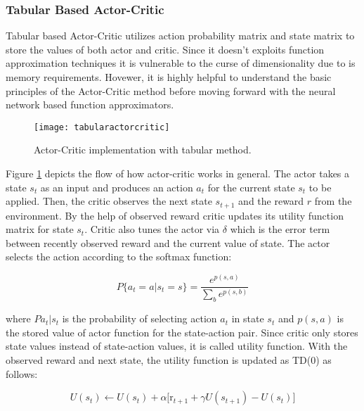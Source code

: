 \documentclass{ituphdreport}
\begin{document}
\subsubsection{Tabular Based Actor-Critic} \label{sec:actorcritictabular}
Tabular based Actor-Critic utilizes action probability matrix and state matrix to store the values of both actor and critic. Since it doesn't exploits function approximation techniques it is vulnerable to the curse of dimensionality due to is memory requirements. Hovewer, it is highly helpful to understand the basic principles of the Actor-Critic method before moving forward with the neural network based function approximators. 

\begin{figure}[h]
	\begin{center}
		\texttt{[image: tabularactorcritic]}
	\end{center}
	\caption{Actor-Critic implementation with tabular method.
		\label{fig:actorcritic}}
\end{figure}

Figure \ref{fig:actorcritic} depicts the flow of how actor-critic works in general. The actor takes a state $s_t$ as an input and produces an action $a_t$ for the current state $s_t$ to be applied. Then, the critic observes the next state  $s_{t+1}$ and the reward $r$ from the environment. By the help of observed reward critic updates its utility function matrix for state  $s_t$. Critic also tunes the actor via $\delta$ which is the error term between recently observed reward and the current value of state. The actor selects the action according to the softmax function:

\begin{equation}
\label{eq:acsoftmax}
P \{a_t = a | s_t = s\} = \frac{e^{p(s,a)}}{\sum_{b}^{} e^{p(s,b)} }
\end{equation}

where $P{a_t|s_t}$ is the probability of selecting action $a_t$ in state $s_t$ and $p(s,a)$ is the stored value of actor function for the state-action pair. Since critic only stores state values instead of state-action values, it is called utility function. With the observed reward and next state, the utility function is updated as TD(0) as follows:

\begin{equation}
\label{eq:acutilityupdate}
U(s_{t}) \leftarrow U(s_{t}) + \alpha \big[ \text{r}_{t+1} + \gamma U(s_{t+1}) - U(s_{t}) \big]
\end{equation}
\end{document}
